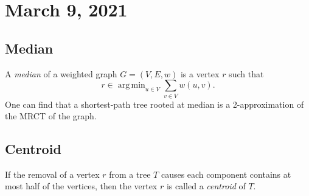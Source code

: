 \documentclass[11pt]{article}
\DeclareMathOperator*{\argmin}{arg \, min}
\begin{document}
\section{March 9, 2021}
\subsection{Median}
A \emph{median} of a weighted graph $G = (V, E, w)$ is a vertex $r$ such that
\begin{equation*}
  r \in \argmin_{u \in V} \sum_{v \in V} w(u, v).
\end{equation*}
One can find that a shortest-path tree rooted at median is a 2-approximation of the MRCT of the graph.

\subsection{Centroid}
If the removal of a vertex $r$ from a tree $T$ causes each component contains at most half of the vertices, then the vertex $r$ is called a \emph{centroid} of $T$.
\end{document}
